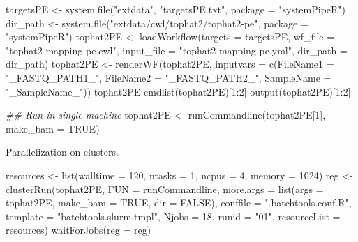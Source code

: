 \documentclass[14pt,]{article}
\newcommand{\hlnum}[1]{\textcolor[rgb]{0.816,0.125,0.439}{#1}}%
\newcommand{\hlstr}[1]{\textcolor[rgb]{0.251,0.627,0.251}{#1}}%
\newcommand{\hlcom}[1]{\textcolor[rgb]{0.502,0.502,0.502}{\textit{#1}}}%
\newcommand{\hlstd}[1]{\textcolor[rgb]{0.251,0.251,0.251}{#1}}%
\newenvironment{Shaded}{\begin{myshaded}}{\end{myshaded}}
\newcommand{\DecValTok}[1]{\hlnum{#1}}
\newcommand{\ConstantTok}[1]{\hlnum{#1}}
\newcommand{\SpecialCharTok}[1]{\hlstr{#1}}
\newcommand{\StringTok}[1]{\hlstr{#1}}
\newcommand{\DocumentationTok}[1]{\hlcom{#1}}
\newcommand{\OtherTok}[1]{{#1}}
\newcommand{\FunctionTok}[1]{\hlstd{#1}}
\newcommand{\AttributeTok}[1]{{#1}}
\newcommand{\NormalTok}[1]{\hlstd{#1}}
\begin{document}
\begin{Shaded}
\begin{Highlighting}[]
\NormalTok{targetsPE }\OtherTok{\textless{}{-}} \FunctionTok{system.file}\NormalTok{(}\StringTok{"extdata"}\NormalTok{, }\StringTok{"targetsPE.txt"}\NormalTok{, }\AttributeTok{package =} \StringTok{"systemPipeR"}\NormalTok{)}
\NormalTok{dir\_path }\OtherTok{\textless{}{-}} \FunctionTok{system.file}\NormalTok{(}\StringTok{"extdata/cwl/tophat2/tophat2{-}pe"}\NormalTok{, }\AttributeTok{package =} \StringTok{"systemPipeR"}\NormalTok{)}
\NormalTok{tophat2PE }\OtherTok{\textless{}{-}} \FunctionTok{loadWorkflow}\NormalTok{(}\AttributeTok{targets =}\NormalTok{ targetsPE, }\AttributeTok{wf\_file =} \StringTok{"tophat2{-}mapping{-}pe.cwl"}\NormalTok{, }
    \AttributeTok{input\_file =} \StringTok{"tophat2{-}mapping{-}pe.yml"}\NormalTok{, }\AttributeTok{dir\_path =}\NormalTok{ dir\_path)}
\NormalTok{tophat2PE }\OtherTok{\textless{}{-}} \FunctionTok{renderWF}\NormalTok{(tophat2PE, }\AttributeTok{inputvars =} \FunctionTok{c}\NormalTok{(}\AttributeTok{FileName1 =} \StringTok{"\_FASTQ\_PATH1\_"}\NormalTok{, }\AttributeTok{FileName2 =} \StringTok{"\_FASTQ\_PATH2\_"}\NormalTok{, }
    \AttributeTok{SampleName =} \StringTok{"\_SampleName\_"}\NormalTok{))}
\NormalTok{tophat2PE}
\FunctionTok{cmdlist}\NormalTok{(tophat2PE)[}\DecValTok{1}\SpecialCharTok{:}\DecValTok{2}\NormalTok{]}
\FunctionTok{output}\NormalTok{(tophat2PE)[}\DecValTok{1}\SpecialCharTok{:}\DecValTok{2}\NormalTok{]}

\DocumentationTok{\#\# Run in single machine}
\NormalTok{tophat2PE }\OtherTok{\textless{}{-}} \FunctionTok{runCommandline}\NormalTok{(tophat2PE[}\DecValTok{1}\NormalTok{], }\AttributeTok{make\_bam =} \ConstantTok{TRUE}\NormalTok{)}
\end{Highlighting}
\end{Shaded}

Parallelization on clusters.

\begin{Shaded}
\begin{Highlighting}[]
\NormalTok{resources }\OtherTok{\textless{}{-}} \FunctionTok{list}\NormalTok{(}\AttributeTok{walltime =} \DecValTok{120}\NormalTok{, }\AttributeTok{ntasks =} \DecValTok{1}\NormalTok{, }\AttributeTok{ncpus =} \DecValTok{4}\NormalTok{, }\AttributeTok{memory =} \DecValTok{1024}\NormalTok{)}
\NormalTok{reg }\OtherTok{\textless{}{-}} \FunctionTok{clusterRun}\NormalTok{(tophat2PE, }\AttributeTok{FUN =}\NormalTok{ runCommandline, }\AttributeTok{more.args =} \FunctionTok{list}\NormalTok{(}\AttributeTok{args =}\NormalTok{ tophat2PE, }
    \AttributeTok{make\_bam =} \ConstantTok{TRUE}\NormalTok{, }\AttributeTok{dir =} \ConstantTok{FALSE}\NormalTok{), }\AttributeTok{conffile =} \StringTok{".batchtools.conf.R"}\NormalTok{, }\AttributeTok{template =} \StringTok{"batchtools.slurm.tmpl"}\NormalTok{, }
    \AttributeTok{Njobs =} \DecValTok{18}\NormalTok{, }\AttributeTok{runid =} \StringTok{"01"}\NormalTok{, }\AttributeTok{resourceList =}\NormalTok{ resources)}
\FunctionTok{waitForJobs}\NormalTok{(}\AttributeTok{reg =}\NormalTok{ reg)}
\end{Highlighting}
\end{Shaded}
\end{document}
